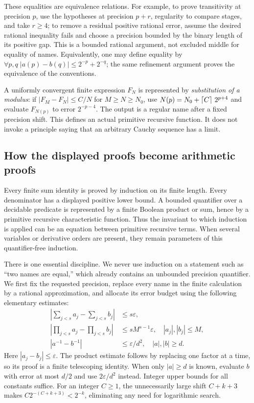These equalities are equivalence relations. For example, to prove
transitivity at precision $p$, use the hypotheses at precision $p+r$,
regularity to compare stages, and take $r\ge4$; to remove a residual
positive rational error, assume the desired rational inequality fails and
choose a precision bounded by the binary length of its positive gap.
This is a bounded rational argument, not excluded middle for equality of
names. Equivalently, one may define equality by
$\forall p,q\;|a(p)-b(q)|\le2^{-p}+2^{-q}$; the same refinement argument
proves the equivalence of the conventions.

A uniformly convergent finite expression $F_N$ is represented by
\emph{substitution of a modulus}: if
$|F_M-F_N|\le C/N$ for $M\ge N\ge N_0$, use
$N(p)=N_0+\left\lceil C\right\rceil\,2^{p+4}$ and evaluate $F_{N(p)}$ to error
$2^{-p-4}$. The output is a regular name after a fixed precision shift.
This defines an actual primitive recursive function. It does not invoke
a principle saying that an arbitrary Cauchy sequence has a limit.

\subsection{How the displayed proofs become arithmetic proofs}

Every finite sum identity is proved by induction on its finite length.
Every denominator has a displayed positive lower bound. A bounded
quantifier over a decidable predicate is represented by a finite Boolean
product or sum, hence by a primitive recursive characteristic function.
Thus the invariant to which induction is applied can be an equation
between primitive recursive terms. When several variables or derivative
orders are present, they remain parameters of this quantifier-free
induction.

There is one essential discipline. We never use induction on a statement
such as ``two names are equal,'' which already contains an unbounded
precision quantifier. We first fix the requested precision, replace every
name in the finite calculation by a rational approximation, and allocate
its error budget using the following elementary estimates:
\begin{align}
 \left|\sum_{j<s}a_j-\sum_{j<s}b_j\right|&\le s\varepsilon,
 \label{eq:sum-budget}\\
 \left|\prod_{j<s}a_j-\prod_{j<s}b_j\right|
 &\le sM^{s-1}\varepsilon,
 \quad |a_j|,|b_j|\le M,
 \label{eq:product-budget}\\
 |a^{-1}-b^{-1}|&\le\varepsilon/d^2,
 \quad |a|,|b|\ge d.\label{eq:inverse-budget}
\end{align}
Here $|a_j-b_j|\le\varepsilon$. The product estimate follows by replacing
one factor at a time, so its proof is a finite telescoping identity. When
only $|a|\ge d$ is known, evaluate $b$ with error at most $d/2$ and use
$2\varepsilon/d^2$ instead. Integer upper bounds for all constants suffice.
For an integer $C\ge1$, the unnecessarily large shift $C+k+3$ makes
$C2^{-(C+k+3)}<2^{-k}$, eliminating any need for logarithmic search.

